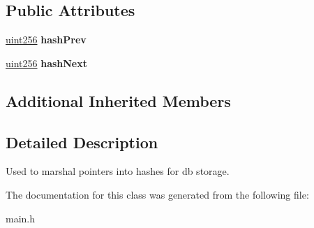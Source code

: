 \subsection*{Public Attributes}
\begin{DoxyCompactItemize}
\item 
\mbox{\label{class_c_disk_block_index_a3a1730201a8523fb947c4d4f632a4212}} 
\mbox{\hyperlink{classuint256}{uint256}} {\bfseries hash\+Prev}
\item 
\mbox{\label{class_c_disk_block_index_a0dda572f44335a5317de18001c3594a8}} 
\mbox{\hyperlink{classuint256}{uint256}} {\bfseries hash\+Next}
\end{DoxyCompactItemize}
\subsection*{Additional Inherited Members}


\subsection{Detailed Description}
Used to marshal pointers into hashes for db storage. 

The documentation for this class was generated from the following file\+:\begin{DoxyCompactItemize}
\item 
main.\+h\end{DoxyCompactItemize}
